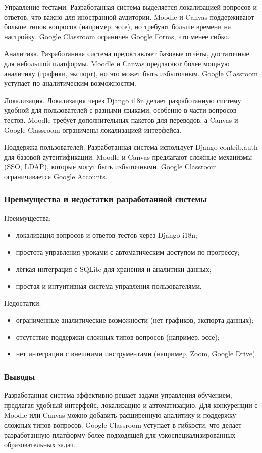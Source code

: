 {Управление тестами.} Разработанная система выделяется локализацией вопросов и ответов, что важно для иностранной аудитории. Moodle и Canvas поддерживают больше типов вопросов (например, эссе), но требуют больше времени на настройку. Google Classroom ограничен Google Forms, что менее гибко.

{Аналитика.} Разработанная система предоставляет базовые отчёты, достаточные для небольшой платформы. Moodle и Canvas предлагают более мощную аналитику (графики, экспорт), но это может быть избыточным. Google Classroom уступает по аналитическим возможностям.

{Локализация.} Локализация через Django i18n делает разработанную систему удобной для пользователей с разными языками, особенно в части вопросов тестов. Moodle требует дополнительных пакетов для переводов, а Canvas и Google Classroom ограничены локализацией интерфейса.

{Поддержка пользователей.} Разработанная система использует Django contrib.auth для базовой аутентификации. Moodle и Canvas предлагают сложные механизмы (SSO, LDAP), которые могут быть избыточными. Google Classroom ограничивается Google Accounts.

\subsubsection{Преимущества и недостатки разработанной системы}

{Преимущества:}
\begin{itemize}
	\item локализация вопросов и ответов тестов через Django i18n;
	\item простота управления уроками с автоматическим доступом по прогрессу;
	\item лёгкая интеграция с SQLite для хранения и аналитики данных;
	\item простая и интуитивная система управления пользователями.
\end{itemize}

{Недостатки:}
\begin{itemize}
	\item ограниченные аналитические возможности (нет графиков, экспорта данных);
	\item отсутствие поддержки сложных типов вопросов (например, эссе);
	\item нет интеграции с внешними инструментами (например, Zoom, Google Drive).
\end{itemize}

\subsubsection{Выводы}

Разработанная система эффективно решает задачи управления обучением, предлагая удобный интерфейс, локализацию и автоматизацию. Для конкуренции с Moodle или Canvas можно добавить расширенную аналитику и поддержку сложных типов вопросов. Google Classroom уступает в гибкости, что делает разработанную платформу более подходящей для узкоспециализированных образовательных задач.



